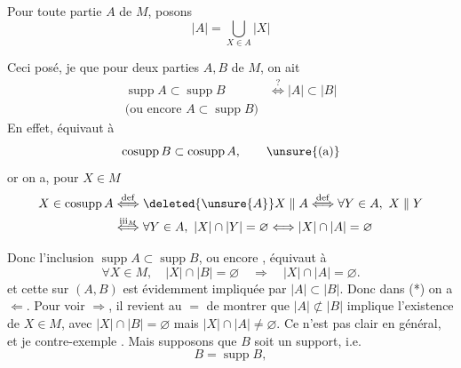 
Pour toute partie $A$ de $M$, posons
\[
|A|=\bigcup_{X\in A}|X|
\]

Ceci posé, je   que pour deux parties $A,B$ de $M$, on ait
\[
\begin{aligned}
\operatorname{supp}A\subset\operatorname{supp}B
&\overset{?}{\Longleftrightarrow}|A|\subset|B|\\
\text{(ou encore }A\subset\operatorname{supp}B\text{)}&
\end{aligned}
\tag*{(*)}
\]
En effet,     équivaut à
\[
\operatorname{cosupp}B\subset\operatorname{cosupp}A,
\tag*{\unsure{(a)}}
\]
or  on a, pour $X\in M$
\[
\begin{aligned}
X\in\operatorname{cosupp}A
&\overset{\mathrm{def}}{\Longleftrightarrow}\deleted{\unsure{A}}X\parallel A
\overset{\mathrm{def}}{\Longleftrightarrow}\forall Y\in A,\ X\parallel Y\\
&\overset{\mathrm{iii}_M}{\Longleftrightarrow}\forall Y\in A,\ |X|\cap|Y|=\varnothing
\Longleftrightarrow |X|\cap|A|=\varnothing
\end{aligned}
\]

Donc l'inclusion $\operatorname{supp}A\subset\operatorname{supp}B$, ou encore , équivaut à
\[
\forall X\in M,\quad |X|\cap|B|=\varnothing\quad\Longrightarrow\quad |X|\cap|A|=\varnothing.
\tag*{($\bullet$)}
\]
et cette   sur $(A,B)$ est évidemment impliquée par $|A|\subset|B|$. Donc dans (*) on a $\Longleftarrow$. Pour voir $\Longrightarrow$, il revient au $=$ de montrer que  $|A|\not\subset|B|$ implique l'existence de $X\in M$, avec $|X|\cap|B|=\varnothing$ mais $|X|\cap|A|\ne\varnothing$. Ce n'est pas clair en général, et je   contre-exemple . Mais supposons que $B$ soit un support, i.e.\ 
\[
B=\operatorname{supp}B,
\]
